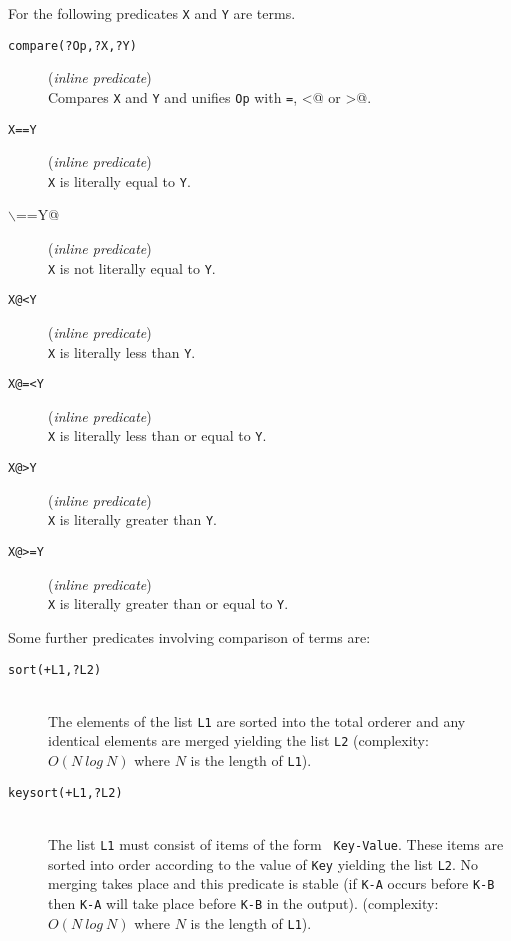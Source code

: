 For the following predicates {\tt X} and {\tt Y} are terms.\\ 

\begin{description}

\item [{\tt compare(?Op,?X,?Y)}] ({\em inline predicate})~\\
	Compares {\tt X} and {\tt Y} and unifies {\tt Op} with
	{\tt =}, {\verb@<@} or {\verb@>@}.

\item [{\tt X==Y}] ({\em inline predicate})~\\
	 {\tt X} is literally equal to {\tt Y}.

\item [{\verb@X$\backslash$==Y@}] ({\em inline predicate})~\\
	{\tt X} is not literally equal to {\tt Y}.

\item [{\verb!X@<Y!}] ({\em inline predicate})~\\
	{\tt X} is literally less than {\tt Y}.

\item [{\verb!X@=<Y!}] ({\em inline predicate})~\\
	{\tt X} is literally less than or equal to {\tt Y}.

\item [{\verb!X@>Y!}] ({\em inline predicate})~\\
	{\tt X} is literally greater than {\tt Y}.

\item [{\verb!X@>=Y!}] ({\em inline predicate})~\\
	{\tt X} is literally greater than or equal to {\tt Y}.

\end{description}


Some further predicates involving comparison of terms are:

\begin{description}

\item [{\tt sort(+L1,?L2)}]~\\
	The elements of the list {\tt L1} are sorted into the total
	orderer and any identical elements are merged yielding the
	list {\tt L2} (complexity: $O(N~log~N)$ where $N$ is the length
	of {\tt L1}).

\item [{\tt keysort(+L1,?L2)}]~\\
	The list {\tt L1} must consist of items of the form {\tt
	Key-Value}. These items are sorted into order according to the
	value of {\tt Key} yielding the list {\tt L2}. No merging
	takes place and this predicate is stable (if {\tt K-A} occurs
	before {\tt K-B} then {\tt K-A} will take place before
	{\tt K-B} in the output). (complexity: $O(N~log~N)$ where $N$
	is the length of {\tt L1}).

\end{description}




